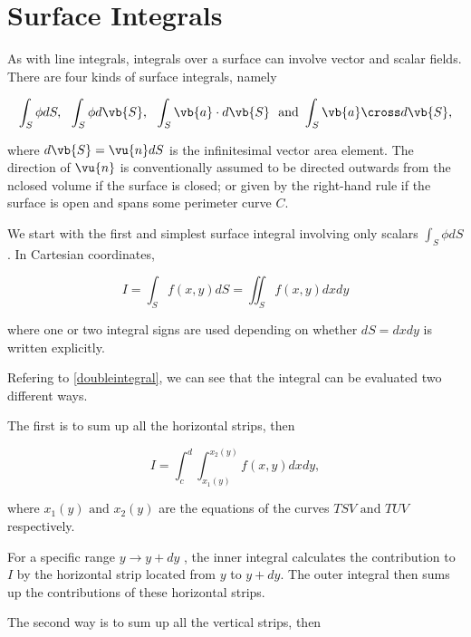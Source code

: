 \documentclass[english,a4paper,12pt]{report}
\begin{document}
\section{Surface Integrals}

As with line integrals, integrals over a surface can involve vector and scalar fields. There are four kinds of surface integrals, namely 

\begin{equation}
    \int_{S}^{} \phi dS, ~~ \int_{S}^{} \phi d\vb{S} , ~~ \int_{S}^{} \vb{a} \cdot d\vb{S} ~ \text { and } \int_{S}^{} \vb{a} \cross d\vb{S},    
\end{equation}

where \(d\vb{S} = \vu{n} dS\) is the infinitesimal vector area element. The direction of \(\vu{n} \) is conventionally assumed to be directed outwards from the nclosed volume if the surface is closed; or given by the right-hand rule if the surface is open and spans some perimeter curve \(C\). 

We start with the first and simplest surface integral involving only scalars \(\int_{S}^{} \phi dS\). In Cartesian coordinates, 

\begin{equation}
    I = \int_{S}^{} f(x,y) dS = \iint_{S}^{} f(x,y) dx dy  
\end{equation}

where one or two integral signs are used depending on whether \(dS = dx dy \) is written explicitly.  

Refering to \cref{doubleintegral}, we can see that the integral can be evaluated two different ways. 


The first is to sum up all the horizontal strips, then 

\begin{equation}
    I = \int_{c}^{d} \int_{x_1 (y)}^{x_2 (y)} f(x,y) dx dy,   
\end{equation}

where \(x_1 (y) \text { and } x_2 (y)\) are the equations of the curves \(TSV \text { and } TUV\) respectively. 

For a specific range \(y \rightarrow y+dy\) , the inner integral calculates the contribution to \(I\) by the horizontal strip located from \(y\) to \(y+dy\). The outer integral then sums up the contributions of these horizontal strips.

The second way is to sum up all the vertical strips, then
\end{document}
